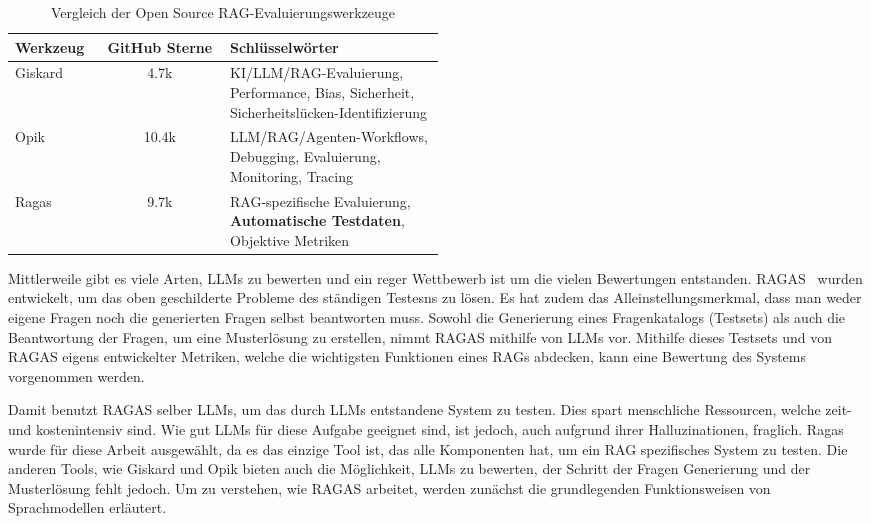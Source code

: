 \begin{table}[h!]
    \centering
    \caption[Vergleich der RAG-Evaluierungswerkzeuge]{Vergleich der Open Source RAG-Evaluierungswerkzeuge}
    \label{tab:rag_eval_comparison}
    \begin{tabular}{|l|c|p{0.5\linewidth}|}
        \hline
        \textbf{Werkzeug} & \textbf{GitHub Sterne} & \textbf{Schlüsselwörter} \\
        \hline
        Giskard & 4.7k & KI/LLM/RAG-Evaluierung, Performance, Bias, Sicherheit, Sicherheitslücken-Identifizierung \\
        \hline
        Opik & 10.4k & LLM/RAG/Agenten-Workflows, Debugging, Evaluierung, Monitoring, Tracing \\
        \hline
        Ragas & 9.7k & RAG-spezifische Evaluierung, \textbf{Automatische Testdaten}, Objektive Metriken \\
        \hline
    \end{tabular}
\end{table}

Mittlerweile gibt es viele Arten, LLMs zu bewerten und ein reger Wettbewerb ist um die vielen Bewertungen entstanden.
RAGAS~\cite{es-etal-2024-ragas} wurden entwickelt, um das oben geschilderte Probleme des ständigen Testesns zu lösen.
Es hat zudem das Alleinstellungsmerkmal, dass man weder eigene Fragen noch die generierten Fragen selbst beantworten muss.
Sowohl die Generierung eines Fragenkatalogs (Testsets) als auch die Beantwortung der Fragen, um eine Musterlösung zu erstellen, nimmt RAGAS mithilfe von LLMs vor.
Mithilfe dieses Testsets und von RAGAS eigens entwickelter Metriken, welche die wichtigsten Funktionen eines RAGs abdecken, kann eine Bewertung des Systems vorgenommen werden.

Damit benutzt RAGAS selber LLMs, um das durch LLMs entstandene System zu testen.
Dies spart menschliche Ressourcen, welche zeit- und kostenintensiv sind.
Wie gut LLMs für diese Aufgabe geeignet sind, ist jedoch, auch aufgrund ihrer Halluzinationen, fraglich.
Ragas wurde für diese Arbeit ausgewählt, da es das einzige Tool ist, das alle Komponenten hat, um ein RAG spezifisches System zu testen.
Die anderen Tools, wie Giskard und Opik bieten auch die Möglichkeit, LLMs zu bewerten, der Schritt der Fragen Generierung und der Musterlösung fehlt jedoch.
Um zu verstehen, wie RAGAS arbeitet, werden zunächst die grundlegenden Funktionsweisen von Sprachmodellen erläutert.

